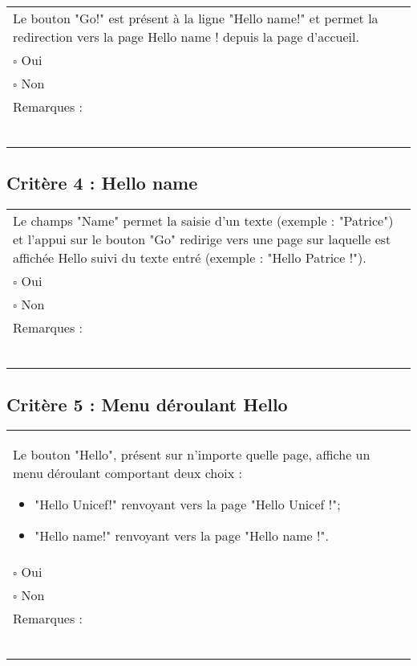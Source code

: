 	\begin{center}
    	 		\begin{tabular}[h]{|p{}|}
			\hline
				Le bouton "Go!" est présent à la ligne "Hello name!" et permet la redirection vers la page Hello name ! depuis la page d'accueil. \\
				$\square$ Oui  \\ $\square$ Non \\\hline Remarques : \\ ~\\
			 \\\hline
     		\end{tabular}
  		\end{center}	
  		
  		
  		
  	\subsection*{Critère 4 : Hello name}
	
	\begin{center}
    	 		\begin{tabular}[h]{|p{}|}
			\hline
				Le champs "Name" permet la saisie d'un texte (exemple : "Patrice") et l'appui sur le bouton "Go" redirige vers une page sur laquelle est affichée Hello suivi du texte entré (exemple : "Hello Patrice !").  \\
				$\square$ Oui  \\ $\square$ Non \\\hline Remarques : \\ ~\\
			 \\\hline
     		\end{tabular}
  		\end{center}	
  		
  			
  	\subsection*{Critère 5 : Menu déroulant Hello}
	
	\begin{center}
    	 		\begin{tabular}[h]{|p{}|}
			\hline
				Le bouton "Hello", présent sur n'importe quelle page, affiche un menu déroulant comportant deux choix : 
				\begin{itemize}
					\item "Hello Unicef!" renvoyant vers la page "Hello Unicef !";
					\item "Hello name!" renvoyant vers la page "Hello name !".
				\end{itemize}				 \\
				$\square$ Oui  \\ $\square$ Non \\\hline Remarques : \\ ~\\
			 \\\hline
     		\end{tabular}
  		\end{center}	
  		

